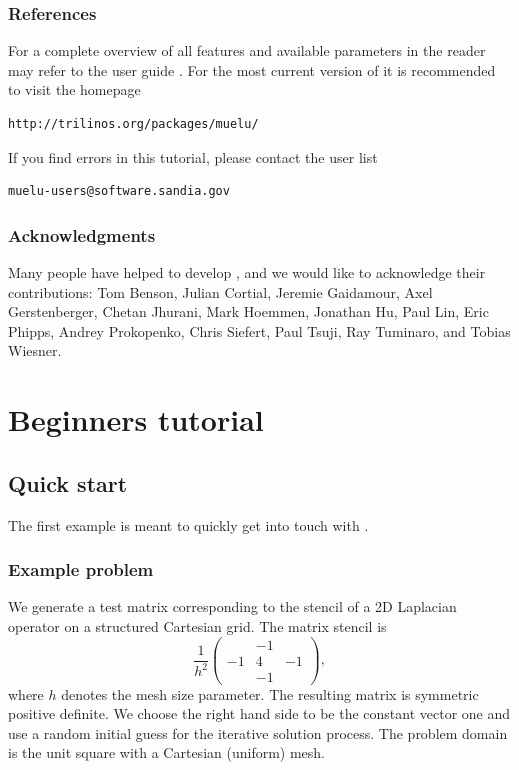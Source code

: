 \documentclass[10pt,fleqn]{book}
\begin{document}
\section*{References}

For a complete overview of all features and available parameters in \muelu the reader may refer to the \muelu user guide \cite{Mue}. For the most current version of \muelu it is recommended to visit the homepage
\begin{verbatim}
http://trilinos.org/packages/muelu/
\end{verbatim}
If you find errors in this tutorial, please contact the \muelu user list
\begin{verbatim}
muelu-users@software.sandia.gov
\end{verbatim}

\section*{Acknowledgments}
Many people have helped to develop \muelu, and we would like to acknowledge their contributions: Tom Benson, Julian Cortial, Jeremie Gaidamour, Axel Gerstenberger, Chetan Jhurani, Mark Hoemmen, Jonathan Hu, Paul Lin, Eric Phipps, Andrey Prokopenko, Chris Siefert, Paul Tsuji, Ray Tuminaro, and Tobias Wiesner.

\part{Beginners tutorial}

\lstset{
  breaklines=true,                %
}



\chapter{Quick start}

The first example is meant to quickly get into touch with \muelu.

\section{Example problem}
\label{lab:examplesym}
We generate a test matrix corresponding to the stencil of a 2D Laplacian operator on a structured Cartesian grid. The matrix stencil is
\begin{equation}
\label{lab:eq1}
\frac{1}{h^2}\begin{pmatrix} & -1 & \\ -1 & 4 & -1 \\ & -1 & \end{pmatrix},
\end{equation}
where $h$ denotes the mesh size parameter.
The resulting matrix is symmetric positive definite. We choose the right hand side to be the constant vector one and use a random initial guess for the iterative solution process. The problem domain is the unit square with a Cartesian (uniform) mesh.
\end{document}

